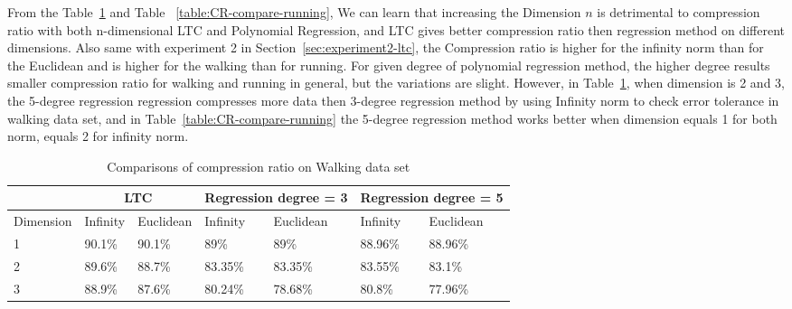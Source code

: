 From the Table~\ref{table:CR-compare-walking} and Table
~\ref{table:CR-compare-running}, We can learn that increasing the Dimension $n$
is detrimental to compression ratio with both n-dimensional LTC and Polynomial
Regression, and LTC gives better compression ratio then regression method on
different dimensions. Also same with experiment 2 in
Section~\ref{sec:experiment2-ltc}, the Compression ratio is higher for the
infinity norm than for the Euclidean and is higher for the walking than for
running. For given degree of polynomial regression method, the higher degree
results smaller compression ratio for walking and running in general, but the
variations are slight. However, in Table~\ref{table:CR-compare-walking}, when
dimension is 2 and 3, the 5-degree regression regression compresses more data
then 3-degree regression method by using Infinity norm to check error tolerance
in walking data set, and in Table~\ref{table:CR-compare-running} the 5-degree
regression method works better when dimension equals 1 for both norm, equals 2
for infinity norm.



\begin{table}[]
\begin{tabular}{|l|l|l|l|l|l|l|l|}
\hline
           & \multicolumn{2}{c|}{LTC} & \multicolumn{2}{c|}{Regression degree = 3} & \multicolumn{3}{l|}{Regression degree = 5}\\ \hline
Dimension & Infinity   & Euclidean   & Infinity    & Euclidean     & Infinity      & \multicolumn{2}{l|}{Euclidean} \\ \hline
1          & 90.1\%     & 90.1\%      & 89\%        & 89\%          & 88.96\%       & \multicolumn{2}{l|}{88.96\%}   \\ \hline
2          & 89.6\%     & 88.7\%      & 83.35\%     & 83.35\%       & 83.55\%       & \multicolumn{2}{l|}{83.1\%}    \\ \hline
3          & 88.9\%     & 87.6\%      & 80.24\%     & 78.68\%       & 80.8\%        & \multicolumn{2}{l|}{77.96\%}   \\ \hline
\end{tabular}
\caption{Comparisons of compression ratio on Walking data set}
\label{table:CR-compare-walking}
\end{table}


